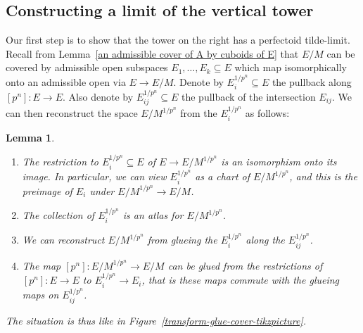 \documentclass[10pt,oneside]{amsart}
\newtheorem{lemma}[theorem]{Lemma}
\theoremstyle{definition}
\begin{document}
		\subsection{Constructing a limit of the vertical tower}
		
		Our first step is to show that the tower on the right has a perfectoid tilde-limit.
		Recall from Lemma~\ref{an admissible cover of A by cuboids of E} that $E/M$ can be covered by admissible open subspaces $E_1,\dots,E_k\subseteq E$ which map isomorphically onto an admissible open via $E\to E/M$. Denote by $E_i^{1/p^n}\subseteq E$ the pullback along $[p^n]:E\rightarrow E$. Also denote by $E_{ij}^{1/p^n}\subseteq E$ the pullback of the intersection $E_{ij}$. We can then reconstruct the space $E/M^{1/p^n}$ from the $E_i^{1/p^n}$ as follows:
		\begin{lemma}\label{compatible cuboid charts for the tower over E/M}
			\leavevmode
			\begin{enumerate}
		\item The restriction to $E_{i}^{1/p^n}\subseteq E$ of $E\rightarrow E/M^{1/p^n}$ is an isomorphism onto its image. In particular, we can view $E_{i}^{1/p^n}$ as a chart of $E/M^{1/p^n}$, and this is the preimage of $E_i$ under $E/M^{1/p^n}\rightarrow E/M$.
		\item The collection of  $E_{i}^{1/p^n}$ is an atlas for  $E/M^{1/p^n}$. 
		\item We can reconstruct $E/M^{1/p^n}$ from glueing the $E_{i}^{1/p^n}$ along the $E_{ij}^{1/p^n}$.
		\item The map $[p^n]:E/M^{1/p^n}\rightarrow E/M$ can be glued from the restrictions of $[p^n]:E\rightarrow E$ to $E_{i}^{1/p^n}\rightarrow E_{i}$, that is these maps commute with the glueing maps on $E_{ij}^{1/p^n}$.
		\end{enumerate}
		The situation is thus like in Figure~\ref{transform-glue-cover-tikzpicture}.
		\end{lemma}
\end{document}
